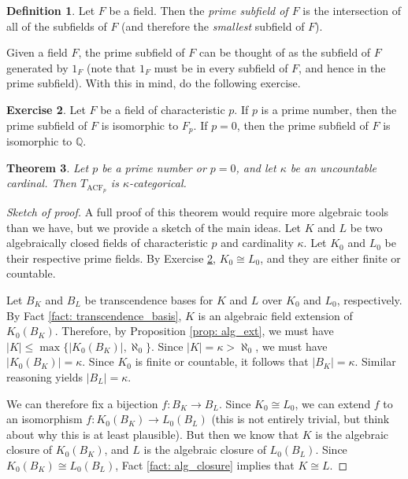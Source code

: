\documentclass[a4paper]{memoir}
\newtheorem{theorem}{Theorem}[section]
\theoremstyle{definition}
\newtheorem{definition}[theorem]{Definition}
\newtheorem{exercise}[theorem]{Exercise}
\newcommand{\bb}{\mathbb}
\newcommand{\ra}{\rightarrow}
\begin{document}
\begin{definition}
  Let $F$ be a field. Then the \emph{prime subfield of $F$} is the 
  intersection of all of the subfields of $F$ (and therefore the 
  \emph{smallest} subfield of $F$).  
\end{definition}

Given a field $F$, the prime subfield of $F$ can be thought of as the 
subfield of $F$ generated by $1_F$ (note that $1_F$ must be in every 
subfield of $F$, and hence in the prime subfield). With this in mind, 
do the following exercise.

\begin{exercise} \label{exercise: prime_field}
  Let $F$ be a field of characteristic $p$. If $p$ is a prime number, then 
  the prime subfield of $F$ is isomorphic to $F_p$. If $p = 0$, then the 
  prime subfield of $F$ is isomorphic to $\bb{Q}$.
\end{exercise}

\begin{theorem} \label{thm: acf_cat}
  Let $p$ be a prime number or $p = 0$, and let $\kappa$ be an uncountable 
  cardinal. Then $T_{\mathrm{ACF}_p}$ is $\kappa$-categorical.
\end{theorem}

\begin{proof}[Sketch of proof]
  A full proof of this theorem would require more algebraic tools than 
  we have, but we provide a sketch of the main ideas.
  Let $K$ and $L$ be two algebraically closed fields of characteristic 
  $p$ and cardinality $\kappa$. Let $K_0$ and $L_0$ be their respective 
  prime fields. By Exercise \ref{exercise: prime_field}, 
  $K_0 \cong L_0$, and they are either finite or countable. 
  
  Let $B_K$ and $B_L$ be transcendence bases for $K$ and $L$ over 
  $K_0$ and $L_0$, respectively. By Fact \ref{fact: transcendence_basis}, 
  $K$ is an algebraic field extension of $K_0(B_K)$. Therefore, by 
  Proposition \ref{prop: alg_ext}, we must have 
  $|K| \leq \max\{|K_0(B_K)|, \aleph_0\}$. Since $|K| = \kappa > \aleph_0$, 
  we must have $|K_0(B_K)| = \kappa$. Since $K_0$ is finite or countable, 
  it follows that $|B_K| = \kappa$. Similar reasoning yields 
  $|B_L| = \kappa$.
  
  We can therefore fix a bijection $f: B_K \ra B_L$. Since 
  $K_0 \cong L_0$, we can extend $f$ to an isomorphism 
  $f:K_0(B_K) \ra L_0(B_L)$ (this is not entirely trivial, but think 
  about why this is at least plausible). But then we know that 
  $K$ is the algebraic closure of $K_0(B_K)$, and 
  $L$ is the algebraic closure of $L_0(B_L)$. Since 
  $K_0(B_K) \cong L_0(B_L)$, Fact \ref{fact: alg_closure} implies 
  that $K \cong L$.
\end{proof}
\end{document}
